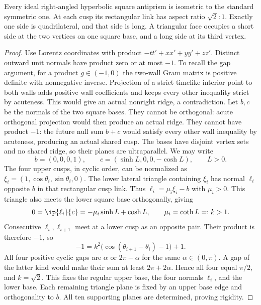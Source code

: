 \begin{lemma}\label{lem:a4rigid}
Every ideal right-angled hyperbolic square antiprism is isometric to
the standard symmetric one. At each cusp its rectangular link has
aspect ratio \(\sqrt2:1\). Exactly one side is quadrilateral, and
that side is long. A triangular face occupies a short side at the
two vertices on one square base, and a long side at its third vertex.
\end{lemma}
\begin{proof}
Use Lorentz coordinates with product
\(-tt'+xx'+yy'+zz'\). Distinct outward unit normals have product
zero or at most \(-1\). To recall the gap argument, for a product
\(g\in(-1,0)\) the two-wall Gram matrix is positive definite
with nonnegative inverse. Projection of a strict timelike interior
point to both walls adds positive wall coefficients and keeps every
other inequality strict by acuteness. This would give an actual
nonright ridge, a contradiction. Let \(b,c\) be the normals of
the two square bases. They cannot be orthogonal: acute orthogonal
projection would then produce an actual ridge. They cannot have
product \(-1\): the future null sum \(b+c\) would satisfy every
other wall inequality by acuteness, producing an actual shared cusp.
The bases have disjoint vertex sets and no shared ridge, so their
planes are ultraparallel. We may write
\[
 b=(0,0,0,1),\qquad c=(\sinh L,0,0,-\cosh L),\qquad L>0.
\]
The four upper cusps, in cyclic order, can be normalized as
\(\xi_i=(1,\cos\theta_i,\sin\theta_i,0)\).
The lower lateral triangle containing \(\xi_i\) has normal
\(\ell_i\) opposite \(b\) in that rectangular cusp link.
Thus \(\ell_i=\mu_i\xi_i-b\) with \(\mu_i>0\).
This triangle also meets the lower square base orthogonally, giving
\[
 0=\ip{\ell_i}{c}=-\mu_i\sinh L+\cosh L,
 \qquad \mu_i=\coth L=:k>1.
\]
Consecutive \(\ell_i,\ell_{i+1}\) meet at a lower cusp as an
opposite pair. Their product is therefore \(-1\), so
\[
 -1=k^2\bigl(\cos(\theta_{i+1}-\theta_i)-1\bigr)+1.
\]
All four positive cyclic gaps are \(\alpha\) or \(2\pi-\alpha\)
for the same \(\alpha\in(0,\pi)\). A gap of the latter kind
would make their sum at least \(2\pi+2\alpha\).
Hence all four equal \(\pi/2\), and \(k=\sqrt2\).
This fixes the regular upper base, the four normals \(\ell_i\),
and the lower base. Each remaining triangle plane is fixed by an
upper base edge and orthogonality to \(b\). All ten supporting
planes are determined, proving rigidity.


\end{proof}
